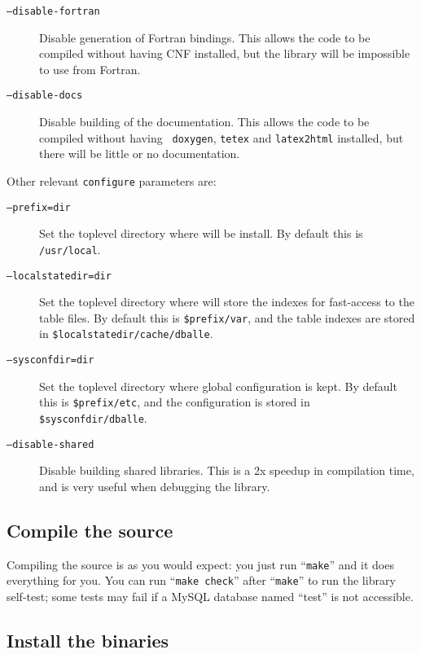 \begin{description}
\item[\tt --disable-fortran] Disable generation of Fortran bindings.  This allows
			   the code to be compiled without having CNF
			   installed, but the library will be impossible to use
			   from Fortran.
\item[\tt --disable-docs] Disable building of the documentation.  This allows
			   the code to be compiled without having {\tt
			   doxygen}, {\tt tetex} and {\tt latex2html}
			   installed, but there will be little or no
			   documentation.
\end{description}

Other relevant {\tt configure} parameters are:

\begin{description}
\item[{\tt --prefix=dir}] Set the toplevel directory where \dballe{} will be
                     install.  By default this is {\tt /usr/local}.
\item[{\tt --localstatedir=dir}] Set the toplevel directory where \dballe{} will
		     store the indexes for fast-access to the table files.  By
		     default this is {\tt \$prefix/var}, and the table indexes
		     are stored in {\tt \$localstatedir/cache/dballe}.
\item[{\tt --sysconfdir=dir}] Set the toplevel directory where global configuration
		     is kept.  By default this is {\tt \$prefix/etc}, and the
		     configuration is stored in {\tt \$sysconfdir/dballe}.
\item[{\tt --disable-shared}] Disable building shared libraries.  This is a 2x
		     speedup in compilation time, and is very useful when
		     debugging the library.
\end{description}

\subsection{Compile the source}

Compiling the source is as you would expect: you just run ``{\tt make}'' and it
does everything for you.  You can run ``{\tt make check}'' after ``{\tt make}''
to run the library self-test; some tests may fail if a MySQL database named
``test'' is not accessible.

\subsection{Install the binaries}

